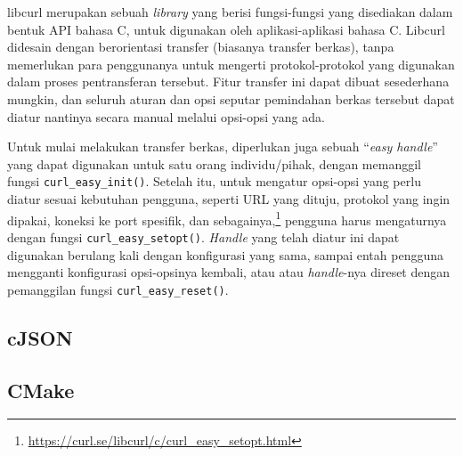 libcurl merupakan sebuah \textit{library} yang berisi fungsi-fungsi yang disediakan dalam bentuk API bahasa C, untuk digunakan oleh aplikasi-aplikasi bahasa C. Libcurl didesain dengan berorientasi transfer (biasanya transfer berkas), tanpa memerlukan para penggunanya untuk mengerti protokol-protokol yang digunakan dalam proses pentransferan tersebut. Fitur transfer ini dapat dibuat sesederhana mungkin, dan seluruh aturan dan opsi seputar pemindahan berkas tersebut dapat diatur nantinya secara manual melalui opsi-opsi yang ada.

Untuk mulai melakukan transfer berkas, diperlukan juga sebuah ``\textit{easy handle}'' yang dapat digunakan untuk satu orang individu/pihak, dengan memanggil fungsi \verb|curl_easy_init()|. Setelah itu, untuk mengatur opsi-opsi yang perlu diatur sesuai kebutuhan pengguna, seperti URL yang dituju, protokol yang ingin dipakai, koneksi ke port spesifik, dan sebagainya,\footnote{\href{https://curl.se/libcurl/c/curl\_easy\_setopt.html}{https://curl.se/libcurl/c/curl\_easy\_setopt.html}} pengguna harus mengaturnya dengan fungsi \verb|curl_easy_setopt()|. \textit{Handle} yang telah diatur ini dapat digunakan berulang kali dengan konfigurasi yang sama, sampai entah pengguna mengganti konfigurasi opsi-opsinya kembali, atau atau \textit{handle}-nya direset dengan pemanggilan fungsi \verb|curl_easy_reset()|.

\subsection{cJSON}
\label{sec:cmodules-cJSON}

\subsection{CMake}
\label{sec:cmodules-CMake}
